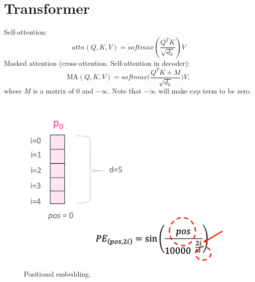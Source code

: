 \section{Transformer}
\label{sec:nlp_transformer}

Self-attention:
$$attn(Q,K,V) = softmax(\frac{Q^TK}{\sqrt{d_k}})V$$
Masked attention (cross-attention. Self-attention in decoder):
$$\textrm{MA}(Q,K,V) = softmax\bigg(\frac{Q^TK+M}{\sqrt{d_k}}\bigg)V,$$
where $M$ is a matrix of 0 and $-\infty$. Note that $-\infty$ will make $exp$ term to be zero.


\begin{figure}[h]
	\centering
	\includegraphics[scale=0.6]{./images/transformer/positional_1.png}
	\caption{Positional embedding.}
\end{figure}
